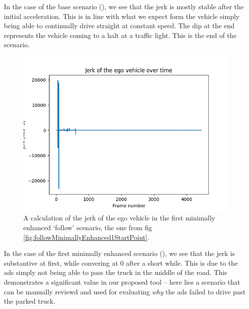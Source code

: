 In the case of the base scenario (), we see that the jerk is mostly stable
after the initial acceleration. This is in line with what we expect form the vehicle simply being
able to continually drive straight at constant speed. The dip at the end represents the vehicle coming to a halt at a traffic light. This is the end of the
scenario.

\begin{figure}[htb]
    \centering
    \includegraphics[width=\textwidth]{experiment-material/follow-minimally-enhanced-1-jerk.png}
    \caption{A calculation of the jerk of the ego vehicle in the first minimally enhanced `follow'
        scenario, the one from fig
        \ref{fig:followMinimallyEnhanced1StartPoint}.}\label{fig:followMinimallyEnhanced1Jerk}
\end{figure}

In the case of the first minimally enhanced scenario (), we
see that the jerk is substantive at first, while convering at \num{0} after a short while. This is
due to the \acrshort{ads} simply not being able to pass the truck in the middle of the road. This
demonstrates a significant value in our proposed tool -- here lies a scenario that can be manually
reviewd and used for evaluating \emph{why} the \acrshort{ads} failed to drive past the parked truck.

